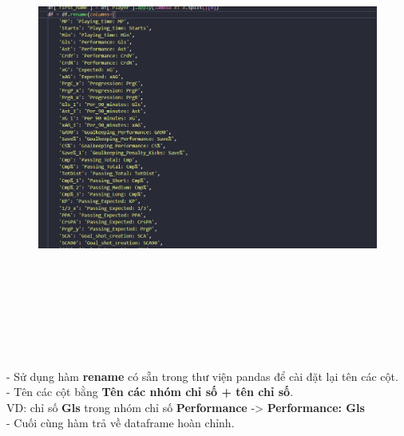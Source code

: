     \begin{figure}[H]
        \centering
        \includegraphics[width=1\linewidth, height=15cm]{img/rename.png}
    \end{figure}
    - Sử dụng hàm \textbf{rename} có sẵn trong thư viện pandas để cài đặt lại tên các cột.\\
    - Tên các cột bằng \textbf{Tên các nhóm chỉ số + tên chỉ số}.\\
    VD: chỉ số \textbf{Gls} trong nhóm chỉ số \textbf{Performance} -> \textbf{Performance: Gls}\\
    - Cuối cùng hàm trả về dataframe hoàn chỉnh.\\

